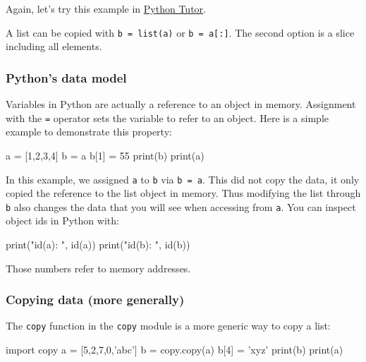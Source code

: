 \documentclass[12pt]{article} \newif\ifsolution\solutiontrue %
\begin{document}
Again, let's try this example in
\href{http://pythontutor.com/iframe-embed.html\#code=a+\%3D+\%5B'a',+'b',+'c'\%5D\%0Ab+\%3D+a+++++++\%23+first+attempt+to+copy+a+to+b\%0Ac+\%3D+list(a\%29+\%23+use+the+list+constructor\%0Ab\%5B1\%5D+\%3D+1++++\%23+now+we+want+to+change+an+element+in+b\&origin=opt-frontend.js\&cumulative=false\&heapPrimitives=false\&textReferences=false\&py=3\&rawInputLstJSON=\%5B\%5D\&curInstr=0\&codeDivWidth=350\&codeDivHeight=400}{Python
Tutor}.

A list can be copied with \texttt{b\ =\ list(a)} or
\texttt{b\ =\ a{[}:{]}}. The second option is a slice including all
elements.

\subsubsection{Python's data model}\label{pythons-data-model}

Variables in Python are actually a reference to an object in memory.
Assignment with the \texttt{=} operator sets the variable to refer to an
object. Here is a simple example to demonstrate this property:

\begin{python}
a = [1,2,3,4] b = a b[1] = 55 print(b) print(a)
\end{python}

In this example, we assigned \texttt{a} to \texttt{b} via
\texttt{b\ =\ a}. This did not copy the data, it only copied the
reference to the list object in memory. Thus modifying the list through
\texttt{b} also changes the data that you will see when accessing from
\texttt{a}. You can inspect object ids in Python with:

\begin{python}
print("id(a): ", id(a)) print("id(b): ", id(b))
\end{python}

Those numbers refer to memory addresses.

\subsubsection{Copying data (more
generally)}\label{copying-data-more-generally}

The \texttt{copy} function in the \texttt{copy} module is a more generic
way to copy a list:

\begin{python}
import copy a = [5,2,7,0,'abc'] b = copy.copy(a) b[4] = 'xyz' print(b) print(a)
\end{python}
\end{document}
